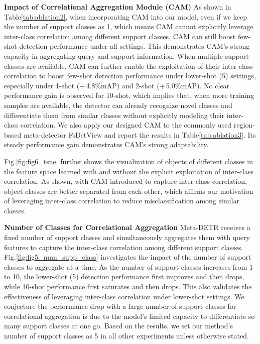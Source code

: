 \documentclass[letterpaper]{article} \usepackage{aaai22}  \usepackage{times}  \usepackage{helvet}  \usepackage{courier}  \usepackage[hyphens]{url}  \usepackage{graphicx} \urlstyle{rm} \def\UrlFont{\rm}  \usepackage{natbib}  \usepackage{caption} \DeclareCaptionStyle{ruled}{labelfont=normalfont,labelsep=colon,strut=off} \frenchspacing  \setlength{\pdfpagewidth}{8.5in}  \setlength{\pdfpageheight}{11in}  \usepackage{algorithm}
\begin{document}
\vspace{+0.5mm}
\smallskip
\noindent\textbf{Impact of Correlational Aggregation Module (CAM)\;\;}
As shown in Table\;\ref{tab:ablation2}, when incorporating CAM into our model, even if we keep the number of support classes as 1, which means CAM cannot explicitly leverage inter-class correlation among different support classes, CAM can still boost few-shot detection performance under all settings. This demonstrates CAM's strong capacity in aggregating query and support information. When multiple support classes are available, CAM can further enable the exploitation of their inter-class correlation to boost few-shot detection performance under lower-shot (5) settings, especially under 1-shot (+\,4.8\%\;mAP) and 2-shot (+\,5.0\%\;mAP). No clear performance gain is observed for 10-shot, which implies that, when more training samples are available, the detector can already recognize novel classes and differentiate them from similar classes without explicitly modeling their inter-class correlation.
We also apply our designed CAM to the commonly used region-based meta-detector FsDetView and report the results in Table\;\ref{tab:ablation3}. Its steady performance gain demonstrates CAM's strong adaptability.


Fig.\;\ref{fig:fig6_tsne} further shows the visualization of objects of different classes in the feature  space learned with and without the explicit exploitation of inter-class correlation. As shown, with CAM introduced to capture inter-class correlation, object classes are better separated from each other, which affirms our motivation of leveraging inter-class correlation to reduce misclassification among similar classes.




\smallskip
\noindent\textbf{Number of Classes for Correlational Aggregation\;\;}
Meta-DETR receives a fixed number of support classes and simultaneously aggregates them with query features to capture the inter-class correlation among different support classes. Fig.\;\ref{fig:fig5_num_supp_class} investigates the impact of the number of support classes to aggregate at a time. As the number of support classes increases from 1 to 10, the lower-shot (5) detection performance first improves and then drops, while 10-shot performance first saturates and then drops. This also validates the effectiveness of leveraging inter-class correlation under lower-shot settings. We conjecture the performance drop with a large number of support classes for correlational aggregation is due to the model's limited capacity to differentiate so many support classes at one go. Based on the results, we set our method's number of support classes as 5 in all other experiments unless otherwise stated.
\end{document}
